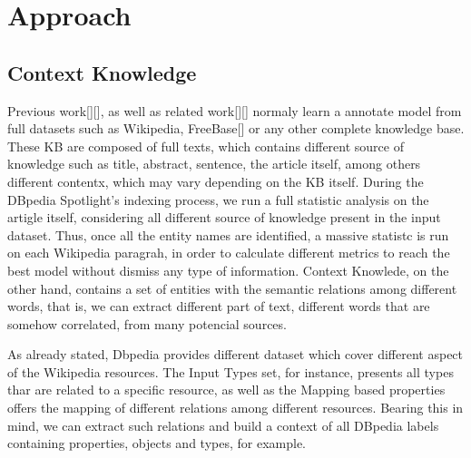 \documentclass[10pt,a4paper]{article}
\newcommand{\todo}[1]{{\color{red}\textsf{\textbf{TODO}}: #1}}
\begin{document}



\section{Approach}

\subsection{Context Knowledge}

Previous work[][], as well as related work[][] normaly learn a annotate model from full datasets such as Wikipedia, FreeBase[] or any other complete knowledge base. These KB are composed of full texts, which contains different source of knowledge such as title, abstract, sentence, the article itself, among others different contentx, which may vary depending on the KB itself. During the DBpedia Spotlight's indexing process, we run a full statistic analysis on the artigle itself, considering all different  source of knowledge present in the input dataset. Thus, once all the entity names are identified, a massive statistc is run on each Wikipedia paragrah, in order to calculate different metrics to reach the best model without dismiss any type of information. Context Knowlede, on the other hand, contains a set of entities with the semantic relations among different words, that is, we can extract different part of text, different words that are somehow correlated, from many potencial sources.

As already stated, Dbpedia provides different dataset which cover different aspect of the Wikipedia resources. The Input Types set, for instance, presents all types thar are related to a specific resource, as well as the Mapping based properties offers the mapping of different relations among different resources. Bearing this in mind, we can extract such relations and build a context of all DBpedia labels containing properties, objects and types, for example.
\end{document}
